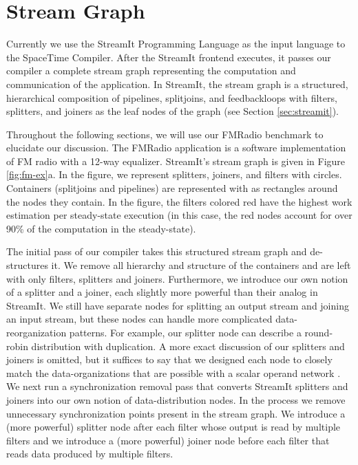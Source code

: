 \section{Stream Graph} 

\begin{figure*}
\centering
{}
\caption{FMRadio with a 12-way equalizer after the passes of the
SpaceTime Compiler.
\protect\label{fig:fm-ex}}
\end{figure*}

Currently we use the StreamIt Programming Language as the input
language to the SpaceTime Compiler. After the StreamIt frontend
executes, it passes our compiler a complete stream graph representing
the computation and communication of the application.  In StreamIt,
the stream graph is a structured, hierarchical composition of
pipelines, splitjoins, and feedbackloops with filters, splitters, and
joiners as the leaf nodes of the graph (see Section
\ref{sec:streamit}).  

Throughout the following sections, we will use our FMRadio benchmark
to elucidate our discussion.  The FMRadio application is a software
implementation of FM radio with a 12-way equalizer.  StreamIt's stream
graph is given in Figure \ref{fig:fm-ex}a.  In the figure, we
represent splitters, joiners, and filters with circles.  Containers
(splitjoins and pipelines) are represented with as rectangles around
the nodes they contain.  In the figure, the filters colored red have
the highest work estimation per steady-state execution (in this case,
the red nodes account for over 90\% of the computation in the
steady-state).

The initial pass of our compiler takes this structured stream graph
and de-structures it.  We remove all hierarchy and structure of the
containers and are left with only filters, splitters and joiners.
Furthermore, we introduce our own notion of a splitter and a joiner,
each slightly more powerful than their analog in StreamIt.  We still
have separate nodes for splitting an output stream and joining an
input stream, but these nodes can handle more complicated
data-reorganization patterns.  For example, our splitter node can
describe a round-robin distribution with duplication.  A more exact
discussion of our splitters and joiners is omitted, but it suffices to
say that we designed each node to closely match the data-organizations
that are possible with a scalar operand network \cite{scalaroperands}.
We next run a synchronization removal pass that converts StreamIt
splitters and joiners into our own notion of data-distribution nodes.
In the process we remove unnecessary synchronization points present in
the stream graph.  We introduce a (more powerful) splitter node after
each filter whose output is read by multiple filters and we introduce
a (more powerful) joiner node before each filter that reads data
produced by multiple filters.

